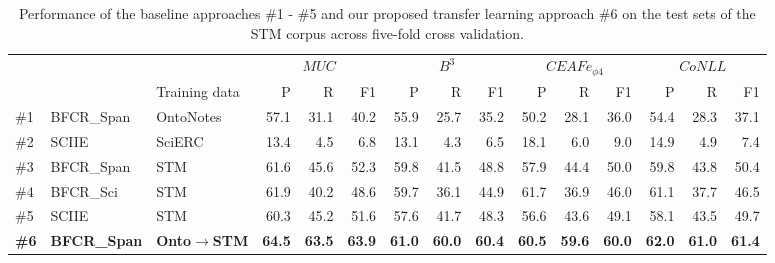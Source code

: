 \documentclass[runningheads]{llncs}
\begin{document}
\begin{table}[tb]
\centering
\small
\caption{Performance of the baseline approaches \#1 - \#5 and our proposed transfer learning approach \#6 on the test sets of the STM corpus across five-fold cross validation.}
\label{tab:coref_results}
\begin{tabular}{lll|rrr|rrr|rrr|rrr}
  &           &                & \multicolumn{3}{c}{$MUC$} & \multicolumn{3}{c}{$B^3$} & \multicolumn{3}{c}{$CEAFe_{\phi 4}$} & \multicolumn{3}{c}{$CoNLL$} \\
  &           & Training data  & P      & R      & F1     & P      & R     & F1    & P       & R      & F1     & P       & R      & F1     \\ \hline
\#1 & BFCR\_Span & OntoNotes                                                  & 57.1   & 31.1   & 40.2  & 55.9   & 25.7  & 35.2  & 50.2    & 28.1   & 36.0   & 54.4    & 28.3   & 37.1   \\
\#2 & SCIIE     & SciERC                                                     & 13.4   & 4.5    & 6.8   & 13.1   & 4.3   & 6.5   & 18.1    & 6.0    & 9.0    & 14.9    & 4.9    & 7.4    \\ \hline
\#3 & BFCR\_Span & STM                                                        
& 61.6	& 45.6	& 52.3 & 59.8	& 41.5	& 48.8 & 57.9	& 44.4	& 50.0 & 59.8	& 43.8	& 50.4 \\
\#4 & BFCR\_Sci  & STM                                                        
& 61.9	& 40.2	& 48.6 & 59.7	& 36.1	& 44.9 & 61.7	& 36.9	& 46.0 & 61.1	& 37.7	& 46.5 \\
\#5 & SCIIE     & STM                                                        & 60.3   & 45.2   & 51.6  & 57.6   & 41.7  & 48.3  & 56.6    & 43.6   & 49.1   & 58.1    & 43.5   & 49.7   \\ \hline
\textbf{\#6} & \textbf{BFCR\_Span} & \textbf{Onto$\rightarrow$STM}
& \textbf{64.5}	& \textbf{63.5}	& \textbf{63.9} & \textbf{61.0}	& \textbf{60.0}	& \textbf{60.4} & \textbf{60.5}	& \textbf{59.6}	& \textbf{60.0} & \textbf{62.0}	& \textbf{61.0}	& \textbf{61.4} 
\end{tabular}
\vspace{-1em}
\end{table}
\end{document}
